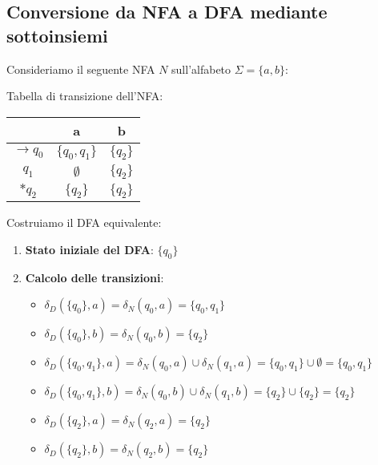 \documentclass[12pt,a4paper]{article}
\begin{document}
\subsection{Conversione da NFA a DFA mediante sottoinsiemi}

\begin{risoluzione}
Consideriamo il seguente NFA $N$ sull'alfabeto $\Sigma = \{a, b\}$:

\begin{figure}[h]
\centering
{}
\end{figure}

Tabella di transizione dell'NFA:
\begin{center}
\begin{tabular}{c|cc}
 & a & b \\
\hline
$\rightarrow q_0$ & $\{q_0, q_1\}$ & $\{q_2\}$ \\
$q_1$ & $\emptyset$ & $\{q_2\}$ \\
$\ast q_2$ & $\{q_2\}$ & $\{q_2\}$ \\
\end{tabular}
\end{center}

Costruiamo il DFA equivalente:

\begin{enumerate}
  \item \textbf{Stato iniziale del DFA}: $\{q_0\}$
  
  \item \textbf{Calcolo delle transizioni}:
    \begin{itemize}
      \item $\delta_D(\{q_0\}, a) = \delta_N(q_0, a) = \{q_0, q_1\}$
      \item $\delta_D(\{q_0\}, b) = \delta_N(q_0, b) = \{q_2\}$
      \item $\delta_D(\{q_0, q_1\}, a) = \delta_N(q_0, a) \cup \delta_N(q_1, a) = \{q_0, q_1\} \cup \emptyset = \{q_0, q_1\}$
      \item $\delta_D(\{q_0, q_1\}, b) = \delta_N(q_0, b) \cup \delta_N(q_1, b) = \{q_2\} \cup \{q_2\} = \{q_2\}$
      \item $\delta_D(\{q_2\}, a) = \delta_N(q_2, a) = \{q_2\}$
      \item $\delta_D(\{q_2\}, b) = \delta_N(q_2, b) = \{q_2\}$
    \end{itemize}
  

\end{enumerate}
\end{risoluzione}
\end{document}
